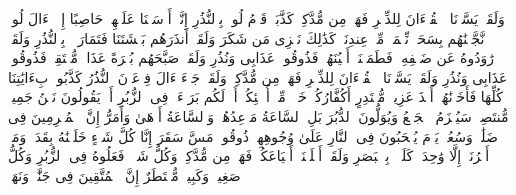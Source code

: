 وَلَقَدۡ یَسَّرۡنَا ٱلۡقُرۡءَانَ لِلذِّكۡرِ فَهَلۡ مِن مُّدَّكِرࣲ%
\stopbuffer
\startbuffer[\q:54:33]
كَذَّبَتۡ قَوۡمُ لُوطِۭ بِٱلنُّذُرِ%
\stopbuffer
\startbuffer[\q:54:34]
إِنَّاۤ أَرۡسَلۡنَا عَلَیۡهِمۡ حَاصِبًا إِلَّاۤ ءَالَ لُوطࣲۖ نَّجَّیۡنَٰهُم بِسَحَرࣲ%
\stopbuffer
\startbuffer[\q:54:35]
نِّعۡمَةࣰ مِّنۡ عِندِنَاۚ كَذَٰلِكَ نَجۡزِی مَن شَكَرَ%
\stopbuffer
\startbuffer[\q:54:36]
وَلَقَدۡ أَنذَرَهُم بَطۡشَتَنَا فَتَمَارَوۡا۟ بِٱلنُّذُرِ%
\stopbuffer
\startbuffer[\q:54:37]
وَلَقَدۡ رَٰوَدُوهُ عَن ضَیۡفِهِۦ فَطَمَسۡنَاۤ أَعۡیُنَهُمۡ فَذُوقُوا۟ عَذَابِی وَنُذُرِ%
\stopbuffer
\startbuffer[\q:54:38]
وَلَقَدۡ صَبَّحَهُم بُكۡرَةً عَذَابࣱ مُّسۡتَقِرࣱّ%
\stopbuffer
\startbuffer[\q:54:39]
فَذُوقُوا۟ عَذَابِی وَنُذُرِ%
\stopbuffer
\startbuffer[\q:54:40]
وَلَقَدۡ یَسَّرۡنَا ٱلۡقُرۡءَانَ لِلذِّكۡرِ فَهَلۡ مِن مُّدَّكِرࣲ%
\stopbuffer
\startbuffer[\q:54:41]
وَلَقَدۡ جَاۤءَ ءَالَ فِرۡعَوۡنَ ٱلنُّذُرُ%
\stopbuffer
\startbuffer[\q:54:42]
كَذَّبُوا۟ بِءَایَٰتِنَا كُلِّهَا فَأَخَذۡنَٰهُمۡ أَخۡذَ عَزِیزࣲ مُّقۡتَدِرٍ%
\stopbuffer
\startbuffer[\q:54:43]
أَكُفَّارُكُمۡ خَیۡرࣱ مِّنۡ أُو۟لَٰۤئِكُمۡ أَمۡ لَكُم بَرَاۤءَةࣱ فِی ٱلزُّبُرِ%
\stopbuffer
\startbuffer[\q:54:44]
أَمۡ یَقُولُونَ نَحۡنُ جَمِیعࣱ مُّنتَصِرࣱ%
\stopbuffer
\startbuffer[\q:54:45]
سَیُهۡزَمُ ٱلۡجَمۡعُ وَیُوَلُّونَ ٱلدُّبُرَ%
\stopbuffer
\startbuffer[\q:54:46]
بَلِ ٱلسَّاعَةُ مَوۡعِدُهُمۡ وَٱلسَّاعَةُ أَدۡهَىٰ وَأَمَرُّ%
\stopbuffer
\startbuffer[\q:54:47]
إِنَّ ٱلۡمُجۡرِمِینَ فِی ضَلَٰلࣲ وَسُعُرࣲ%
\stopbuffer
\startbuffer[\q:54:48]
یَوۡمَ یُسۡحَبُونَ فِی ٱلنَّارِ عَلَىٰ وُجُوهِهِمۡ ذُوقُوا۟ مَسَّ سَقَرَ%
\stopbuffer
\startbuffer[\q:54:49]
إِنَّا كُلَّ شَیۡءٍ خَلَقۡنَٰهُ بِقَدَرࣲ%
\stopbuffer
\startbuffer[\q:54:50]
وَمَاۤ أَمۡرُنَاۤ إِلَّا وَٰحِدَةࣱ كَلَمۡحِۭ بِٱلۡبَصَرِ%
\stopbuffer
\startbuffer[\q:54:51]
وَلَقَدۡ أَهۡلَكۡنَاۤ أَشۡیَاعَكُمۡ فَهَلۡ مِن مُّدَّكِرࣲ%
\stopbuffer
\startbuffer[\q:54:52]
وَكُلُّ شَیۡءࣲ فَعَلُوهُ فِی ٱلزُّبُرِ%
\stopbuffer
\startbuffer[\q:54:53]
وَكُلُّ صَغِیرࣲ وَكَبِیرࣲ مُّسۡتَطَرٌ%
\stopbuffer
\startbuffer[\q:54:54]
إِنَّ ٱلۡمُتَّقِینَ فِی جَنَّٰتࣲ وَنَهَرࣲ%
\stopbuffer
